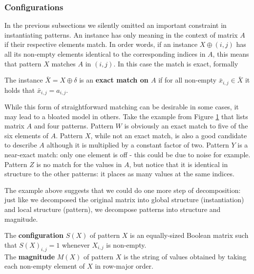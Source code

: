 \documentclass{llncs}
\begin{document}
\subsubsection{Configurations}

In the previous subsections we silently omitted an important constraint in instantiating patterns. An instance has only meaning in the context of matrix $A$ if their respective elements match. In order words, if an instance $X \oplus (i,j)$ has all its non-empty elements identical to the corresponding indices in $A$, this means that pattern $X$ matches $A$ in $(i,j)$. In this case the match is exact, formally
\begin{definition}
The instance $\bar{X}=X \oplus \delta$ is an \textbf{exact match on $A$} if for all non-empty $\bar{x}_{i,j} \in \bar{X}$ it holds that $\bar{x}_{i,j} = a_{i,j}$.
\end{definition}

While this form of straightforward matching can be desirable in some cases, it may lead to a bloated model in others. Take the example from Figure \ref{example3} that lists matrix $A$ and four patterns. Pattern $W$ is obviously an exact match to five of the six elements of $A$. Pattern $X$, while not an exact match, is also a good candidate to describe $A$ although it is multiplied by a constant factor of two. Pattern $Y$ is a near-exact match: only one element is off - this could be due to noise for example. Pattern $Z$ is no match for the values in $A$, but notice that it is identical in structure to the other patterns: it places as many values at the same indices. 

\begin{figure}

\label{example3}
\end{figure}

The example above suggests that we could do one more step of decomposition: just like we decomposed the original matrix into global structure (instantiation) and local structure (pattern), we decompose patterns into structure and magnitude. 

\begin{definition}
The \textbf{configuration} $S(X)$ of pattern $X$ is an equally-sized Boolean matrix such that $S(X)_{i,j}=1$ whenever $X_{i,j}$ is non-empty.\\
The \textbf{magnitude} $M(X)$ of pattern $X$ is the string of values obtained by taking each non-empty element of $X$ in row-major order.
\end{definition}
\end{document}
